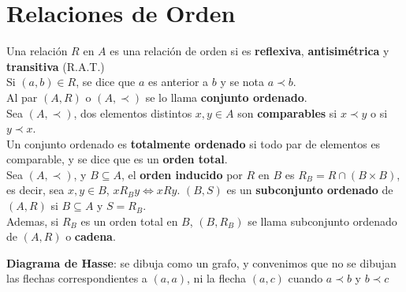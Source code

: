 \documentclass[11pt,a4paper]{article}
\begin{document}
\section{Relaciones de Orden}
Una relaci\'on $R$ en $A$ es una relaci\'on de orden si es \textbf{reflexiva}, \textbf{antisim\'etrica} y \textbf{transitiva} (R.A.T.)\\

Si $(a,b) \in R$, se dice que $a$ es anterior a $b$ y se nota $a \prec b$.\\

Al par $(A,R)$ o $(A, \prec)$ se lo llama \textbf{conjunto ordenado}.\\

Sea $(A, \prec)$, dos elementos distintos $x, y \in A$ son \textbf{comparables} si $x \prec y$ o si $y \prec x$.\\

Un conjunto ordenado es \textbf{totalmente ordenado} si todo par de elementos es comparable, y se dice que es un \textbf{orden total}.\\

Sea $(A, \prec)$, y $B \subseteq A$, el \textbf{orden inducido} por $R$ en $B$ es $R_B = R \cap (B\times B)$, es decir, sea $x,y \in B$, $xR_By \iff xRy$. $(B,S)$ es un \textbf{subconjunto ordenado} de $(A,R)$ si $B \subseteq A$ y $S = R_B$. \\

Ademas, si $R_B$ es un orden total en $B$, $(B, R_B)$ se llama subconjunto ordenado de $(A, R)$ o \textbf{cadena}.\\

\noindent \dotfill

\textbf{Diagrama de Hasse}: se dibuja como un grafo, y convenimos que no se dibujan las flechas correspondientes a $(a,a)$, ni la flecha $(a,c)$ cuando $a \prec b$ y $b \prec c$

\noindent \dotfill
\end{document}
